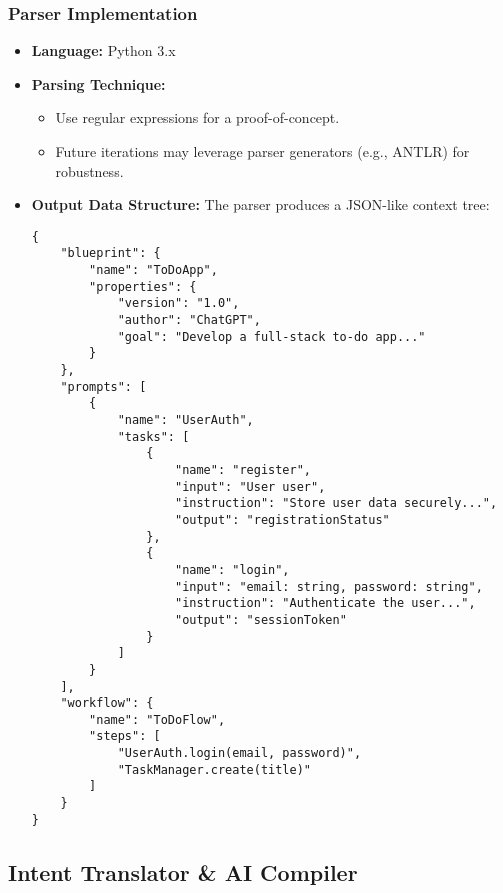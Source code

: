 \documentclass[11pt]{article}
\begin{document}
\subsubsection{Parser Implementation}
\begin{itemize}
    \item \textbf{Language:} Python 3.x  
    \item \textbf{Parsing Technique:} 
    \begin{itemize}
        \item Use regular expressions for a proof-of-concept.
        \item Future iterations may leverage parser generators (e.g., ANTLR) for robustness.
    \end{itemize}
    \item \textbf{Output Data Structure:} The parser produces a JSON-like context tree:
\begin{verbatim}
{
    "blueprint": {
        "name": "ToDoApp",
        "properties": {
            "version": "1.0",
            "author": "ChatGPT",
            "goal": "Develop a full-stack to-do app..."
        }
    },
    "prompts": [
        {
            "name": "UserAuth",
            "tasks": [
                {
                    "name": "register",
                    "input": "User user",
                    "instruction": "Store user data securely...",
                    "output": "registrationStatus"
                },
                {
                    "name": "login",
                    "input": "email: string, password: string",
                    "instruction": "Authenticate the user...",
                    "output": "sessionToken"
                }
            ]
        }
    ],
    "workflow": {
        "name": "ToDoFlow",
        "steps": [
            "UserAuth.login(email, password)",
            "TaskManager.create(title)"
        ]
    }
}
\end{verbatim}
\end{itemize}

\subsection{Intent Translator \& AI Compiler}
\end{document}
